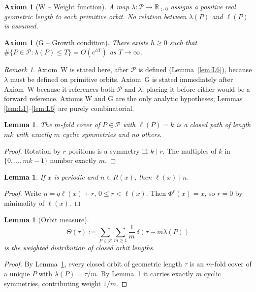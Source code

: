 \documentclass[12pt,a4paper]{article}
\newtheorem{lemma}[theorem]{Lemma}
\newtheorem{axiom}[theorem]{Axiom}
\theoremstyle{remark}
\newtheorem*{remark}{Remark}
\begin{document}
\begin{axiom}[W -- Weight function]\label{ax:W}
A map $\lambda:\mathcal{P}\to\mathbb{R}_{>0}$ assigns a positive real
\emph{geometric length} to each primitive orbit.
No relation between $\lambda(P)$ and $\ell(P)$ is assumed.
\end{axiom}

\begin{axiom}[G -- Growth condition]\label{ax:G}
There exists $h\ge0$ such that
$\#\{P\in\mathcal{P}:\lambda(P)\le T\}=O(e^{hT})$ as $T\to\infty$.
\end{axiom}

\begin{remark}
Axiom~W is stated here, after $\mathcal{P}$ is defined (Lemma~\ref{lem:L6}),
because $\lambda$ must be defined on primitive orbits.
Axiom~G is stated immediately after Axiom~W because it references both
$\mathcal{P}$ and $\lambda$; placing it before either would be a
forward reference.
Axioms W and G are the only analytic hypotheses;
Lemmas \ref{lem:L1}--\ref{lem:L6} are purely combinatorial.
\end{remark}

\begin{lemma}\label{lem:L7}
The $m$-fold cover of $P\in\mathcal{P}$ with $\ell(P)=k$ is a closed
path of length $mk$ with exactly $m$ cyclic symmetries and no others.
\end{lemma}
\begin{proof}
Rotation by $r$ positions is a symmetry iff $k\mid r$.
The multiples of $k$ in $\{0,\ldots,mk-1\}$ number exactly $m$.
\end{proof}

\begin{lemma}\label{lem:L8}
If $x$ is periodic and $n\in R(x)$, then $\ell(x)\mid n$.
\end{lemma}
\begin{proof}
Write $n=q\ell(x)+r$, $0\le r<\ell(x)$. Then $\Phi^r(x)=x$,
so $r=0$ by minimality of $\ell(x)$.
\end{proof}

\begin{lemma}[Orbit measure]\label{lem:L9}
\[
\Theta(\tau)
:= \sum_{P\in\mathcal{P}}\sum_{m\ge1}
\frac{1}{m}\,\delta\!\left(\tau-m\lambda(P)\right)
\]
is the weighted distribution of closed orbit lengths.
\end{lemma}
\begin{proof}
By Lemma~\ref{lem:L8}, every closed orbit of geometric length $\tau$
is an $m$-fold cover of a unique $P$ with $\lambda(P)=\tau/m$.
By Lemma~\ref{lem:L7} it carries exactly $m$ cyclic symmetries,
contributing weight $1/m$.
\end{proof}
\end{document}
